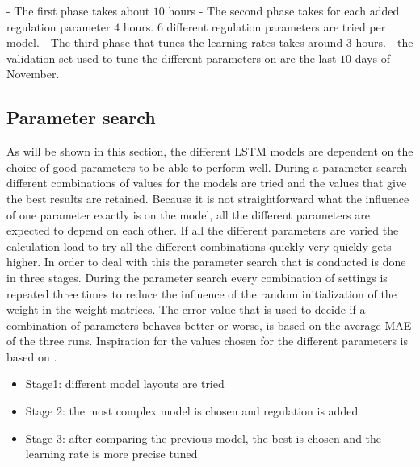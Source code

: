 - The first phase takes about $ 10 $ hours
- The second phase takes for each added regulation parameter $ 4 $ hours. $ 6 $ different regulation parameters are tried per model. 
- The third phase that tunes the learning rates takes around $ 3 $ hours.
- the validation set used to tune the different parameters on are the last $ 10 $ days of November. 

\subsection{Parameter search}\label{s:Parameter search}
As will be shown in this section, the different LSTM models are dependent on the choice of good parameters to be able to perform well. During a parameter search different combinations of values for the models are tried and the values that give the best results are retained. Because it is not straightforward what the influence of one parameter exactly is on the model, all the different parameters are expected to depend on each other. If all the different parameters are varied the calculation load to try all the different combinations quickly very quickly gets higher. In order to deal with this the parameter search that is conducted is done in three stages. During the parameter search every combination of settings is repeated three times to reduce the influence of the random initialization of the weight in the weight matrices. The error value that is used to decide if a combination of parameters behaves better or worse, is based on the average MAE of the three runs. Inspiration for the values chosen for the different parameters is based on \cite{Shi2018}.

\begin{itemize}
	\item Stage1: different model layouts are tried
	\item Stage 2: the most complex model is chosen and regulation is added
	\item Stage 3: after comparing the previous model, the best is chosen and the learning rate is more precise tuned
\end{itemize}

